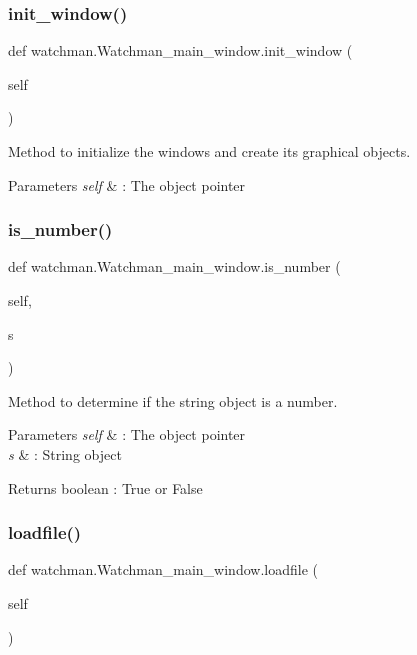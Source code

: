\subsubsection{init\_window()}
{\footnotesize\ttfamily def watchman.\+Watchman\+\_\+main\+\_\+window.\+init\+\_\+window (\begin{DoxyParamCaption}\item[{}]{self }\end{DoxyParamCaption})}



Method to initialize the windows and create its graphical objects. 


\begin{DoxyParams}{Parameters}
{\em self} & \+: The object pointer \\
\hline
\end{DoxyParams}
\mbox{\label{classwatchman_1_1_watchman__main__window_ab13d784cf818f892727af9b2caa1c7fb}} 
\subsubsection{is\_number()}
{\footnotesize\ttfamily def watchman.\+Watchman\+\_\+main\+\_\+window.\+is\+\_\+number (\begin{DoxyParamCaption}\item[{}]{self,  }\item[{}]{s }\end{DoxyParamCaption})}



Method to determine if the string object is a number. 


\begin{DoxyParams}{Parameters}
{\em self} & \+: The object pointer \\
\hline
{\em s} & \+: String object \\
\hline
\end{DoxyParams}
\begin{DoxyReturn}{Returns}
boolean \+: True or False 
\end{DoxyReturn}
\mbox{\label{classwatchman_1_1_watchman__main__window_aabb93204515ee2a01c81d9a2dd846a89}} 
\subsubsection{loadfile()}
{\footnotesize\ttfamily def watchman.\+Watchman\+\_\+main\+\_\+window.\+loadfile (\begin{DoxyParamCaption}\item[{}]{self }\end{DoxyParamCaption})}



